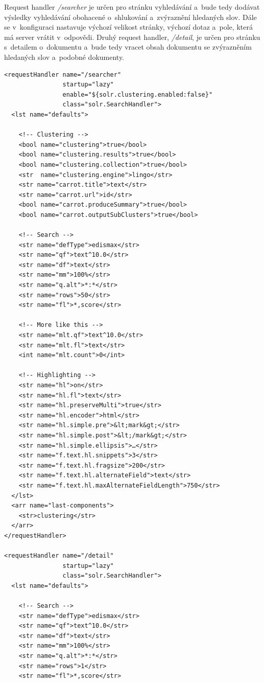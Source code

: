 Request handler \emph{/searcher} je určen pro stránku vyhledávání a~bude tedy dodávat výsledky vyhledávání obohacené o~shlukování a~zvýraznění hledaných slov. Dále se v~konfiguraci nastavuje výchozí velikost stránky, výchozí dotaz a~pole, která má server vrátit v~odpovědi. Druhý request handler, \emph{/detail}, je určen pro stránku s~detailem o~dokumentu a~bude tedy vracet obsah dokumentu se zvýrazněním hledaných slov a~podobné dokumenty.

\begin{verbatim}
<requestHandler name="/searcher"
                startup="lazy"
                enable="${solr.clustering.enabled:false}"
                class="solr.SearchHandler">
  <lst name="defaults">
  
    <!-- Clustering -->
    <bool name="clustering">true</bool>
    <bool name="clustering.results">true</bool>
    <bool name="clustering.collection">true</bool>
    <str  name="clustering.engine">lingo</str>
    <str name="carrot.title">text</str>
    <str name="carrot.url">id</str>
    <bool name="carrot.produceSummary">true</bool>
    <bool name="carrot.outputSubClusters">true</bool>
    
    <!-- Search -->
    <str name="defType">edismax</str>
    <str name="qf">text^10.0</str>
    <str name="df">text</str>
    <str name="mm">100%</str>
    <str name="q.alt">*:*</str>
    <str name="rows">50</str>
    <str name="fl">*,score</str>
    
    <!-- More like this -->
    <str name="mlt.qf">text^10.0</str>
    <str name="mlt.fl">text</str>
    <int name="mlt.count">0</int>
    
    <!-- Highlighting -->
    <str name="hl">on</str>
    <str name="hl.fl">text</str>
    <str name="hl.preserveMulti">true</str>
    <str name="hl.encoder">html</str>
    <str name="hl.simple.pre">&lt;mark&gt;</str>
    <str name="hl.simple.post">&lt;/mark&gt;</str>
    <str name="hl.simple.ellipsis">…</str>
    <str name="f.text.hl.snippets">3</str>
    <str name="f.text.hl.fragsize">200</str>
    <str name="f.text.hl.alternateField">text</str>
    <str name="f.text.hl.maxAlternateFieldLength">750</str>
  </lst>
  <arr name="last-components">
    <str>clustering</str>
  </arr>
</requestHandler>

<requestHandler name="/detail"
                startup="lazy"
                class="solr.SearchHandler">
  <lst name="defaults">
  
    <!-- Search -->
    <str name="defType">edismax</str>
    <str name="qf">text^10.0</str>
    <str name="df">text</str>
    <str name="mm">100%</str>
    <str name="q.alt">*:*</str>
    <str name="rows">1</str>
    <str name="fl">*,score</str>
    

\end{verbatim}
